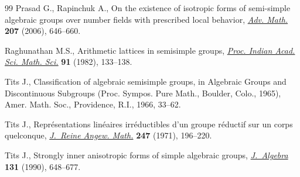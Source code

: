 \begin{thebibliography}{99}
Prasad G., Rapinchuk A., On the existence of isotropic forms of semi-simple
  algebraic groups over number f\/ields with prescribed local behavior,
  \href{http://dx.doi.org/10.1016/j.aim.2006.01.001}{\textit{Adv. Math.}} \textbf{207} (2006), 646--660.

Raghunathan M.S., Arithmetic lattices in semisimple groups, \href{http://dx.doi.org/10.1007/BF02967980}{\textit{Proc.
  Indian Acad. Sci. Math. Sci.}} \textbf{91} (1982), 133--138.

Tits J., Classif\/ication of algebraic semisimple groups, in Algebraic {G}roups
  and {D}iscontinuous {S}ubgroups ({P}roc. {S}ympos. {P}ure {M}ath., {B}oulder,
  {C}olo., 1965), Amer. Math. Soc., Providence, R.I., 1966, 33--62.

Tits J., Repr\'esentations lin\'eaires irr\'eductibles d'un groupe r\'eductif
  sur un corps quelconque, \href{http://dx.doi.org/10.1515/crll.1971.247.196}{\textit{J.~Reine Angew. Math.}} \textbf{247} (1971),
  196--220.

Tits J., Strongly inner anisotropic forms of simple algebraic groups,
  \href{http://dx.doi.org/10.1016/0021-8693(90)90201-X}{\textit{J.~Algebra}} \textbf{131} (1990), 648--677.


\end{thebibliography}

